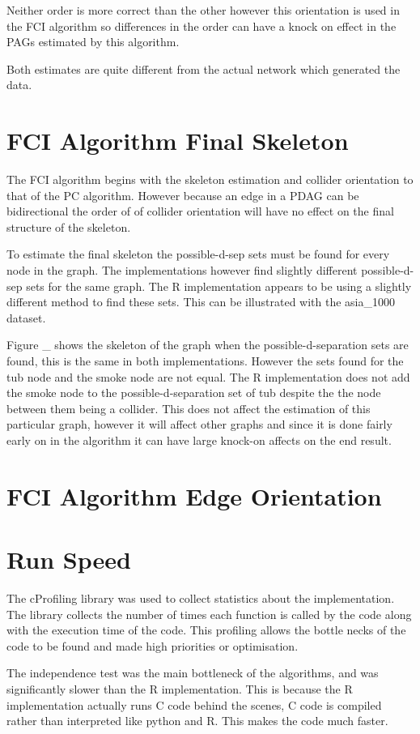 \documentclass{UoYCSproject}
\begin{document}
Neither order is more correct than the other however this orientation is used in the FCI algorithm so differences in the order can have a  knock on effect in the PAGs estimated by this algorithm.

Both estimates are quite different from the actual network which generated the data.

\section{FCI Algorithm Final Skeleton}
The FCI algorithm begins with the skeleton estimation and collider orientation to that of the PC algorithm. However because an edge in a PDAG can be bidirectional the order of of collider orientation will have no effect on the final structure of the skeleton.

To estimate the final skeleton the possible-d-sep sets must be found for every node in the graph. The implementations however find slightly different possible-d-sep sets for the same graph. The R implementation appears to be using a slightly different method to find these sets. This can be illustrated with the asia\_1000 dataset.

Figure \_ shows the skeleton of the graph when the possible-d-separation sets are found, this is the same in both implementations. However the sets found for the tub node and the smoke node are not equal. The R implementation does not add the smoke node to the possible-d-separation set of tub despite the the node between them being a collider. This does not affect the estimation of this particular graph, however it will affect other graphs and since it is done fairly early on in the algorithm it can have large knock-on affects on the end result.

\section{FCI Algorithm Edge Orientation}

\section{Run Speed}
The cProfiling library was used to collect statistics about the implementation. The library collects the number of times each function is called by the code along with the execution time of the code. This profiling allows the bottle necks of the code to be found and made high priorities or optimisation.

The independence test was the main bottleneck of the algorithms, and was significantly slower than the R implementation. This is because the R implementation actually runs C code behind the scenes, C code is compiled rather than interpreted like python and R. This makes the code much faster.
\end{document}
